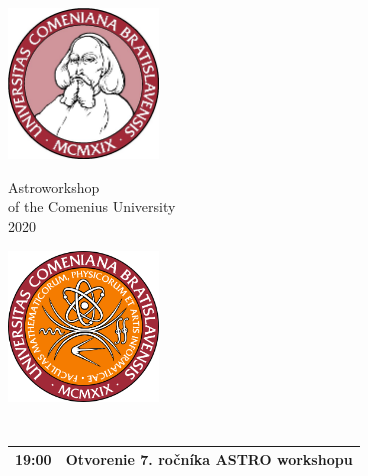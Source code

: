 \documentclass[a4paper]{report}
\begin{document}
    \begin{minipage}{\textwidth}
        \begin{minipage}{0.2\textwidth}
            \includegraphics[width=40mm]{input/logo.jpg}
        \end{minipage}
        \begin{minipage}{0.5\textwidth}
            \centering
            \Huge
            Astroworkshop\\
            \large
            of the Comenius University\\
            2020
        \end{minipage}
        \begin{minipage}{0.2\textwidth}
            \includegraphics[width=40mm]{input/fmfi.png}
        \end{minipage}
    \end{minipage}

            \section{\color[rgb]{0, 0.1, 0.4}{štvrtok}}

        \begin{tabularx}{\textwidth}{>{}p{2cm} >{\RaggedRight}X}
            \toprule
                            {\Large 19:00} & {\Large Otvorenie 7. ročníka ASTRO workshopu} \\
                                                                                                        \bottomrule
        \end{tabularx}

            \section{\color[rgb]{0, 0.1, 0.4}{piatok}}
\end{document}
